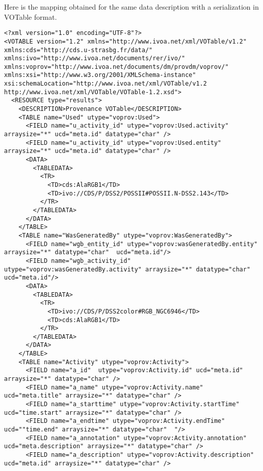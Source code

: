 Here is the mapping obtained for the same data description with a serialization in VOTable format.

\begin{verbatim}
<?xml version="1.0" encoding="UTF-8"?>
<VOTABLE version="1.2" xmlns="http://www.ivoa.net/xml/VOTable/v1.2" 
xmlns:cds="http://cds.u-strasbg.fr/data/" 
xmlns:ivo="http://www.ivoa.net/documents/rer/ivo/" 
xmlns:voprov="http://www.ivoa.net/documents/dm/provdm/voprov/" 
xmlns:xsi="http://www.w3.org/2001/XMLSchema-instance" 
xsi:schemaLocation="http://www.ivoa.net/xml/VOTable/v1.2 http://www.ivoa.net/xml/VOTable/VOTable-1.2.xsd">
  <RESOURCE type="results">
    <DESCRIPTION>Provenance VOTable</DESCRIPTION>
    <TABLE name="Used" utype="voprov:Used">
      <FIELD name="u_activity_id" utype="voprov:Used.activity" arraysize="*" ucd="meta.id" datatype="char" />
      <FIELD name="u_activity_id" utype="voprov:Used.entity" arraysize="*" ucd="meta.id" datatype="char" />
      <DATA>
        <TABLEDATA>
          <TR>
            <TD>cds:AlaRGB1</TD>
            <TD>ivo://CDS/P/DSS2/POSSII#POSSII.N-DSS2.143</TD>
          </TR>
        </TABLEDATA>
      </DATA>
    </TABLE>
    <TABLE name="WasGeneratedBy" utype="voprov:WasGeneratedBy">
      <FIELD name="wgb_entity_id" utype="voprov:wasGeneratedBy.entity" arraysize="*" datatype="char"  ucd="meta.id"/>
      <FIELD name="wgb_activity_id" utype="voprov:wasGeneratedBy.activity" arraysize="*" datatype="char" ucd="meta.id"/>
      <DATA>
        <TABLEDATA>
          <TR>
            <TD>ivo://CDS/P/DSS2color#RGB_NGC6946</TD>
            <TD>cds:AlaRGB1</TD>
          </TR>
        </TABLEDATA>
      </DATA>
    </TABLE>
    <TABLE name="Activity" utype="voprov:Activity">
      <FIELD name="a_id"  utype="voprov:Activity.id" ucd="meta.id" arraysize="*" datatype="char" />
      <FIELD name="a_name" utype="voprov:Activity.name" ucd="meta.title" arraysize="*" datatype="char" />
      <FIELD name="a_starttime" utype="voprov:Activity.startTime" ucd="time.start" arraysize="*" datatype="char" />
      <FIELD name="a_endtime" utype="voprov:Activity.endTime" ucd=""time.end" arraysize="*" datatype="char"  "/>
      <FIELD name="a_annotation" utype="voprov:Activity.annotation" ucd="meta.description" arraysize="*" datatype="char" />
      <FIELD name="a_description" utype="voprov:Activity.description" ucd="meta.id" arraysize="*" datatype="char" />

\end{verbatim}
